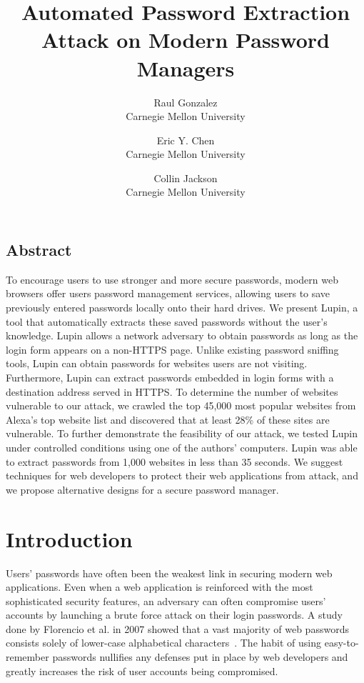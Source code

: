 \documentclass[letterpaper,twocolumn,10pt]{article}
\begin{document}
\date{}

\title{\Large \bf Automated Password Extraction Attack on Modern Password Managers}

\author{
{\rm Raul Gonzalez}\\
Carnegie Mellon University
\and
{\rm Eric Y. Chen}\\
Carnegie Mellon University
\and
{\rm Collin Jackson}\\
Carnegie Mellon University
} 

\maketitle

\thispagestyle{empty}


\subsection*{Abstract}

To encourage users to use stronger and more secure passwords, modern web browsers offer users password management services, allowing users to save previously entered passwords locally onto their hard drives. We present Lupin, a tool that automatically extracts these saved passwords without the user's knowledge. Lupin allows a network adversary to obtain passwords as long as the login form appears on a non-HTTPS page. Unlike existing password sniffing tools, Lupin can obtain passwords for websites users are not visiting. Furthermore, Lupin can extract passwords embedded in login forms with a destination address served in HTTPS. To determine the number of websites vulnerable to our attack, we crawled the top 45,000 most popular websites from Alexa's top website list and discovered that at least 28\% of these sites are vulnerable. To further demonstrate the feasibility of our attack, we tested Lupin under controlled conditions using one of the authors' computers. Lupin was able to extract passwords from 1,000 websites in less than 35 seconds. We suggest techniques for web developers to protect their web applications from attack, and we propose alternative designs for a secure password manager.


\section{Introduction}

Users' passwords have often been the weakest link in securing modern 
web applications. Even when a web application is reinforced with the 
most sophisticated security features, an adversary can often 
compromise users' accounts by launching a brute force attack on their 
login passwords. A study done by Florencio et al. in 2007 showed that a vast majority of 
web passwords consists solely of lower-case alphabetical 
characters~\cite{www07_florencio}. The habit of using easy-to-remember 
passwords nullifies any defenses put in place by web developers and 
greatly increases the risk of user accounts being compromised. 
\end{document}
